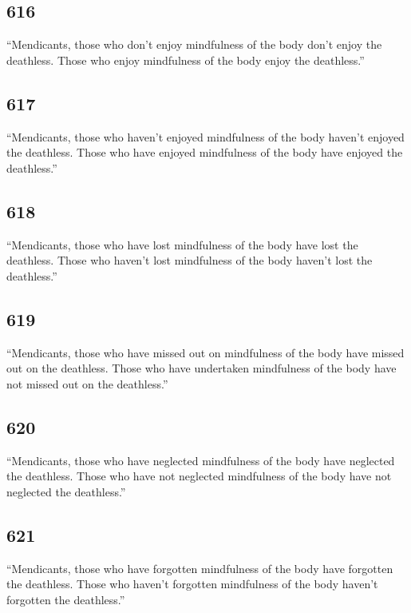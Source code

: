 \documentclass[12pt,openany]{book}%
\begin{document}
\subsection*{616 }

“Mendicants, those who don’t enjoy mindfulness of the body don’t enjoy the deathless. Those who enjoy mindfulness of the body enjoy the deathless.” 

\subsection*{617 }

“Mendicants, those who haven’t enjoyed mindfulness of the body haven’t enjoyed the deathless. Those who have enjoyed mindfulness of the body have enjoyed the deathless.” 

\subsection*{618 }

“Mendicants, those who have lost mindfulness of the body have lost the deathless. Those who haven’t lost mindfulness of the body haven’t lost the deathless.” 

\subsection*{619 }

“Mendicants, those who have missed out on mindfulness of the body have missed out on the deathless. Those who have undertaken mindfulness of the body have not missed out on the deathless.” 

\subsection*{620 }

“Mendicants, those who have neglected mindfulness of the body have neglected the deathless. Those who have not neglected mindfulness of the body have not neglected the deathless.” 

\subsection*{621 }

“Mendicants, those who have forgotten mindfulness of the body have forgotten the deathless. Those who haven’t forgotten mindfulness of the body haven’t forgotten the deathless.” 
\end{document}
